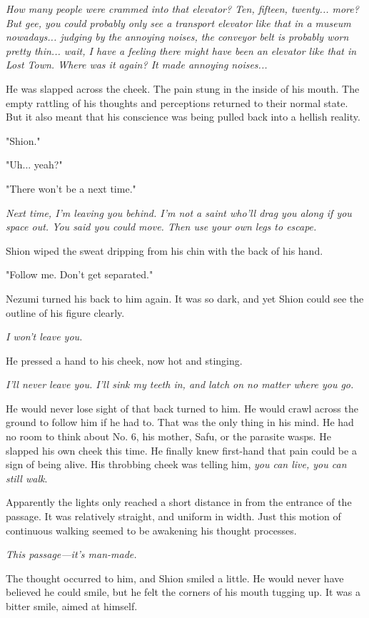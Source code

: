 \emph{How many people were crammed into that elevator? Ten, fifteen, twenty...
more? But gee, you could probably only see a transport elevator like
that in a museum nowadays... judging by the annoying noises, the
conveyor belt is probably worn pretty thin... wait, I have a feeling
there might have been an elevator like that in Lost Town. Where was it
again? It made annoying noises...}

He was slapped across the cheek. The pain stung in the inside of his
mouth. The empty rattling of his thoughts and perceptions returned to
their normal state. But it also meant that his conscience was being
pulled back into a hellish reality.

"Shion."

"Uh... yeah?"

"There won't be a next time."

\emph{Next time, I'm leaving you behind. I'm not a saint who'll drag you along
if you space out. You said you could move. Then use your own legs to
escape.}

Shion wiped the sweat dripping from his chin with the back of his hand.

"Follow me. Don't get separated."

Nezumi turned his back to him again. It was so dark, and yet Shion could
see the outline of his figure clearly.

\emph{I won't leave you.}

He pressed a hand to his cheek, now hot and stinging.

\emph{I'll never leave you. I'll sink my teeth in, and latch on no matter
where you go.}

He would never lose sight of that back turned to him. He would crawl
across the ground to follow him if he had to. That was the only thing in
his mind. He had no room to think about No. 6, his mother, Safu, or the
parasite wasps. He slapped his own cheek this time. He finally knew
first-hand that pain could be a sign of being alive. His throbbing cheek
was telling him, \emph{you can live, you can still walk}.

Apparently the lights only reached a short distance in from the entrance
of the passage. It was relatively straight, and uniform in width. Just
this motion of continuous walking seemed to be awakening his thought
processes.

\emph{This passage---it's man-made.}

The thought occurred to him, and Shion smiled a little. He would never
have believed he could smile, but he felt the corners of his mouth
tugging up. It was a bitter smile, aimed at himself.

